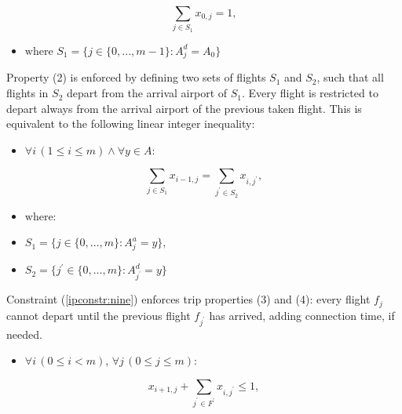 \documentclass{mpaper}
\begin{document}
\vspace{-1mm}
\begin{equation}
\label{ipconstr:six}
\sum_{j \in S_{1}} x_{0,j} = 1,
\end{equation}
\vspace{-1mm}

\begin{itemize}
\item[]
$\textrm{where } S_{1} = \{j \in \{0,...,m-1\} : A^{d}_{j} = A_{0}\}$
\end{itemize}

Property (2) is enforced by defining two sets of flights $S_{1}$ and $S_{2}$, such that all flights in $S_{2}$ depart from the arrival airport of $S_{1}$. Every flight is restricted to depart always from the arrival airport of the previous taken flight. This is equivalent to the following linear integer inequality:

\begin{itemize}
\item[]
$\forall i \, (1 \leq i \leq m) \wedge \forall y \in A:$
\end{itemize}
\vspace{-2mm}
\begin{equation}
\label{ipconstr:eight}
\sum_{j \in S_{1}} x_{i-1,j} = \sum_{j^{\prime} \in S_{2}} x_{i,j^{\prime}},
\end{equation}
\vspace{-3mm}

\begin{itemize}
\item[]
$\textrm{where:}$
\item[]
$S_{1} = \{j \in \{0,...,m\} : A^{a}_{j} = y\},$
\item[]
$S_{2} = \{j^{\prime} \in \{0,...,m\} : A^{d}_{j^{\prime}} = y\}$
\end{itemize}

Constraint (\ref{ipconstr:nine}) enforces trip properties (3) and (4): every flight $f_{j}$ cannot depart until the previous flight $f_{j^{\prime}}$ has arrived, adding connection time, if needed.

\begin{itemize}
\item[]
$\forall i \, (0 \leq i < m), \, \forall j \, (0 \leq j \leq m):$
\end{itemize}
\vspace{-2mm}
\begin{equation}
\label{ipconstr:nine}
x_{i+1,j} + \sum_{j^{\prime} \in F^{\prime}} x_{i,j^{\prime}} \leq 1,
\end{equation}
\end{document}

